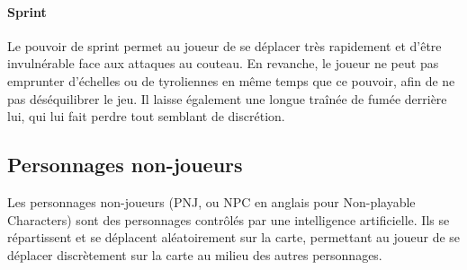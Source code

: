     \paragraph{Sprint}
	
        Le pouvoir de sprint permet au joueur de se déplacer très rapidement et d'être invulnérable face aux attaques 
        au couteau. En revanche, le joueur ne peut pas emprunter d'échelles ou de tyroliennes en même temps que ce pouvoir, afin 
        de ne pas déséquilibrer le jeu. Il laisse également une longue traînée de fumée derrière lui, qui lui fait perdre 
        tout semblant de discrétion. 

    
\subsection{Personnages non-joueurs}

        Les personnages non-joueurs (PNJ, ou NPC en anglais pour Non-playable Characters) sont des personnages contrôlés par une intelligence 
        artificielle. Ils se répartissent et se déplacent aléatoirement sur la carte, permettant au joueur de se déplacer discrètement sur la carte au milieu des 
        autres personnages.
    